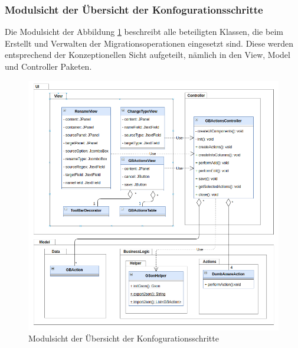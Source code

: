 	\subsubsection{Modulsicht der Übersicht der Konfogurationsschritte}
	Die Modulsicht der Abbildung \ref{img:modulsicht-gbactions} beschreibt alle beteiligten Klassen, die beim Erstellt und Verwalten der Migrationsoperationen eingesetzt sind. Diese werden entsprechend der Konzeptionellen Sicht aufgeteilt, nämlich in den View, Model und Controller Paketen.\\
	\begin{figure}[H]
		\centering
		\includegraphics[width=\textwidth]{images/sichten/modulsicht-gbactions}
		\caption{Modulsicht der Übersicht der Konfogurationsschritte}
		\label{img:modulsicht-gbactions}
	\end{figure}
